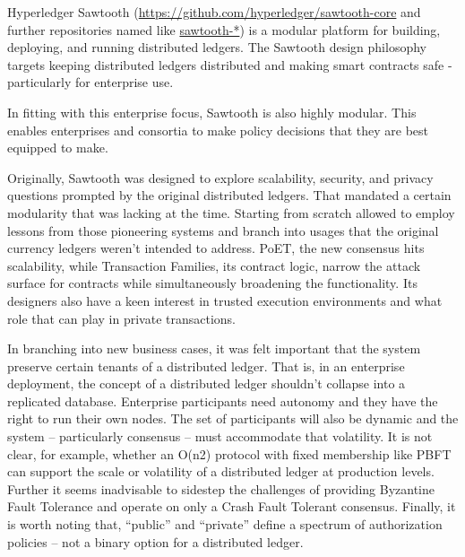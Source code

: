 Hyperledger Sawtooth (\url{https://github.com/hyperledger/sawtooth-core} and further repositories named like \url{sawtooth-*}) is a modular platform for building, deploying, and running distributed ledgers. The Sawtooth design philosophy targets keeping distributed ledgers distributed and making smart contracts safe - particularly for enterprise use.

In fitting with this enterprise focus, Sawtooth is also highly modular. This enables enterprises and consortia to make policy decisions that they are best equipped to make.

Originally, Sawtooth was designed to explore scalability, security, and privacy questions prompted by the original distributed ledgers. That mandated a certain modularity that was lacking at the time. Starting from scratch allowed to employ lessons from those pioneering systems and branch into usages that the original currency ledgers weren't intended to address. PoET, the new consensus hits scalability, while Transaction Families, its contract logic, narrow the attack surface for contracts while simultaneously broadening the functionality. Its designers also have a keen interest in trusted execution environments and what role that can play in private transactions.

In branching into new business cases, it was felt important that the system preserve certain tenants of a distributed ledger. That is, in an enterprise deployment, the concept of a distributed ledger shouldn't collapse into a replicated database. Enterprise participants need autonomy and they have the right to run their own nodes. The set of participants will also be dynamic and the system – particularly consensus – must accommodate that volatility. It is not clear, for example, whether an O(n2) protocol with fixed membership like PBFT can support the scale or volatility of a distributed ledger at production levels. Further it seems inadvisable to sidestep the challenges of providing Byzantine Fault Tolerance and operate on only a Crash Fault Tolerant consensus. Finally, it is worth noting that, “public” and “private” define a spectrum of authorization policies – not a binary option for a distributed ledger.
